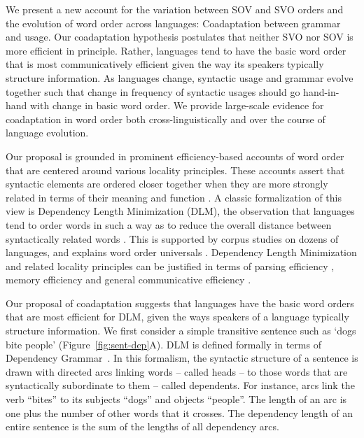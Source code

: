 \documentclass[9pt,twocolumn,twoside,lineno]{pnas-new}
\begin{document}
We present a new account for the variation between SOV and SVO orders and the evolution of word order across languages: Coadaptation between grammar and usage. Our coadaptation hypothesis postulates that neither SVO nor SOV is more efficient in principle.
Rather, languages tend to have the basic word order that is most communicatively efficient given the way its speakers typically structure information. As languages change, syntactic usage and grammar evolve together such that change in frequency of syntactic usages should go hand-in-hand with change in basic word order. We provide large-scale evidence for coadaptation in word order both cross-linguistically and over the course of language evolution.

Our proposal is grounded in prominent efficiency-based accounts of word order that are centered around various locality principles. These accounts assert that syntactic elements are ordered closer together when they are more strongly related in terms of their meaning and function \citep{behaghel1932deutsche,givon1985iconicity,rijkhoff-word-1986,hawkins-performance-1994}.
A classic formalization of this view is Dependency Length Minimization (DLM), the observation that languages tend to order words in such a way as to reduce the overall distance between syntactically related words \citep{rijkhoff-word-1986,hawkins-performance-1994,liu2008dependency,futrell-cross-linguistic-2015, liu-dependency-2017, futrell2020dependency}.
This is supported by corpus studies on dozens of languages, and explains word order universals \citep{rijkhoff-word-1986, hawkins-performance-1994, hahn2020universals}.
Dependency Length Minimization and related locality principles can be justified in terms of parsing efficiency \citep{hawkins-performance-1994}, memory efficiency \citep{gibson-linguistic-1998} and general communicative efficiency \citep{hahn2020universals}.




Our proposal of coadaptation suggests that languages have the basic word orders that are most efficient for DLM, given the ways speakers of a language typically structure information.
We first consider a simple transitive sentence such as `dogs bite people' (Figure~\ref{fig:sent-dep}A). 
DLM is defined formally in terms of Dependency Grammar~\citep{hays1964dependency,hudson1984word,melcuk1988dependency,corbett1993heads,tesniere2015elements}.
In this formalism, the syntactic structure of a sentence is drawn with directed arcs linking words -- called heads -- to those words that are syntactically subordinate to them -- called dependents.
For instance, arcs link the verb ``bites'' to its subjects ``dogs'' and objects ``people''.
The length of an arc is one plus the number of other words that it crosses.
The dependency length of an entire sentence is the sum of the lengths of all dependency arcs.
\end{document}
